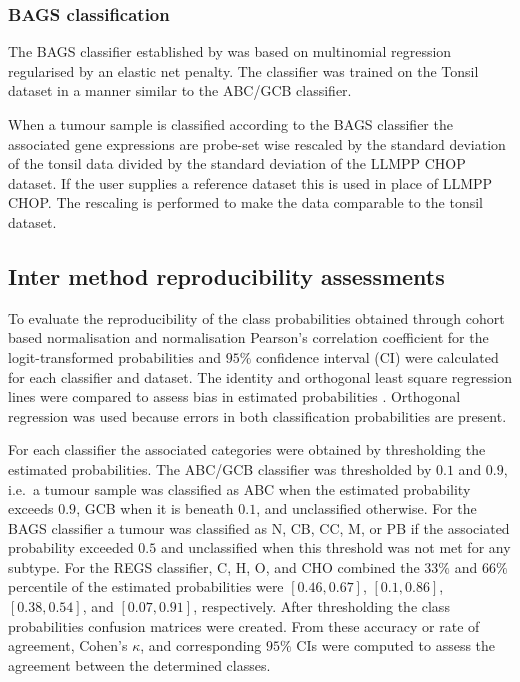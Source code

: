 \documentclass{article}
\begin{document}
\subsubsection{BAGS classification}
The BAGS classifier established by \citet{DybkaerBoegsted2015} was based on multinomial regression regularised by an elastic net penalty.
The classifier was trained on the Tonsil dataset in a manner similar to the ABC/GCB classifier.

When a tumour sample is classified according to the BAGS classifier the associated gene expressions are probe-set wise rescaled by the standard deviation of the tonsil data divided by the standard deviation of the LLMPP CHOP dataset.
If the user supplies a reference dataset this is used in place of LLMPP CHOP.
The rescaling is performed to make the data comparable to the tonsil dataset.


\subsection{Inter method reproducibility assessments}
To evaluate the reproducibility of the class probabilities obtained through cohort based normalisation and \hemaClass{} normalisation Pearson's correlation coefficient for the logit-transformed probabilities and $95\%$ confidence interval (CI) were calculated for each classifier and dataset.
The identity and orthogonal least square regression lines were compared to assess bias in estimated probabilities \citep{CHEN1989}.
Orthogonal regression was used because errors in both classification probabilities are present.

For each classifier the associated categories were obtained by thresholding the estimated probabilities.
The ABC/GCB classifier was thresholded by $0.1$ and $0.9$, i.e.\ a tumour sample was classified as ABC when the estimated probability exceeds $0.9$, GCB when it is beneath $0.1$, and unclassified otherwise.
For the BAGS classifier a tumour was classified as N, CB, CC, M, or PB if the associated probability exceeded $0.5$ and unclassified when this threshold was not met for any subtype.
For the REGS classifier, C, H, O, and CHO combined the $33\%$ and $66\%$ percentile of the estimated probabilities were $[0.46, 0.67]$, $[0.1, 0.86]$, $[0.38, 0.54]$, and $[0.07, 0.91]$, respectively.
After thresholding the class probabilities confusion matrices were created.
From these accuracy or rate of agreement, Cohen's $\kappa$, and corresponding $95\%$ CIs were computed to assess the agreement between the determined classes.
\end{document}
